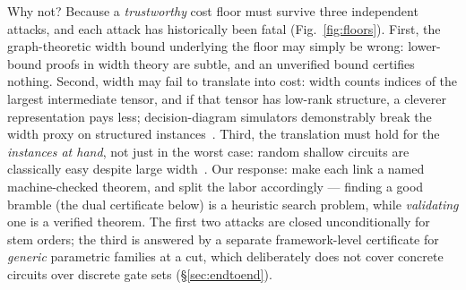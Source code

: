 \documentclass[sigplan,10pt,screen,review,anonymous]{acmart}
\begin{document}
Why not? Because a \emph{trustworthy} cost floor must survive three independent attacks, and
each attack has historically been fatal (Fig.~\ref{fig:floors}). First, the graph-theoretic
width bound underlying the floor may simply be wrong: lower-bound proofs in width theory are
subtle, and an unverified bound certifies nothing. Second, width may fail to translate into
cost: width counts indices of the largest intermediate tensor, and if that tensor has
low-rank structure, a cleverer representation pays less; decision-diagram simulators
demonstrably break the width proxy on structured instances~\cite{dd2025treewidth}. Third,
the translation must hold for the \emph{instances at hand}, not just in the worst case:
random shallow circuits are classically easy despite large width~\cite{napp2022efficient}.
Our response: make each link a named machine-checked theorem, and split the labor
accordingly — finding a good bramble (the dual certificate below) is a heuristic search
problem, while \emph{validating} one is a verified theorem. The first two attacks are closed
unconditionally for stem orders; the third is answered by a separate framework-level
certificate for \emph{generic} parametric families at a cut, which deliberately does not
cover concrete circuits over discrete gate sets (\S\ref{sec:endtoend}).
\end{document}
